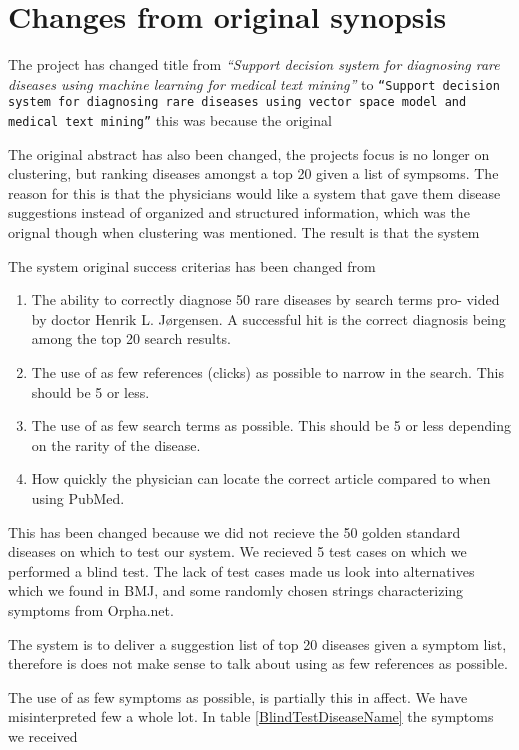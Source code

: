 \chapter{Changes from original synopsis}

The project has changed title from \textit{``Support decision system
  for diagnosing rare diseases using machine learning for medical text
  mining''} to \texttt{``Support decision system for diagnosing rare
  diseases using vector space model and medical text mining''} this
was because the original

The original abstract has also been changed, the projects focus is no
longer on clustering, but ranking diseases amongst a top 20 given a
list of sympsoms. The reason for this is that the physicians would
like a system that gave them disease suggestions instead of organized
and structured information, which was the orignal though when
clustering was mentioned. The result is that the system

The system original success criterias has been changed from
\begin{enumerate}
\item The ability to correctly diagnose 50 rare diseases by search
  terms pro- vided by doctor Henrik L. Jørgensen. A successful hit is
  the correct diagnosis being among the top 20 search results.
\item The use of as few references (clicks) as possible to narrow in
  the search.  This should be 5 or less.
\item The use of as few search terms as possible. This should be 5 or
  less depending on the rarity of the disease.
\item How quickly the physician can locate the correct article
  compared to when using PubMed.
\end{enumerate}

This has been changed because we did not recieve the 50 golden
standard diseases on which to test our system. We recieved 5 test
cases on which we performed a blind test. The lack of test cases made
us look into alternatives which we found in BMJ, and some randomly
chosen strings characterizing symptoms from Orpha.net.

The system is to deliver a suggestion list of top 20 diseases given a
symptom list, therefore is does not make sense to talk about using as
few references as possible.

The use of as few symptoms as possible, is partially this in affect. We have misinterpreted few a whole lot. In table \ref{BlindTestDiseaseName} the symptoms we received 
